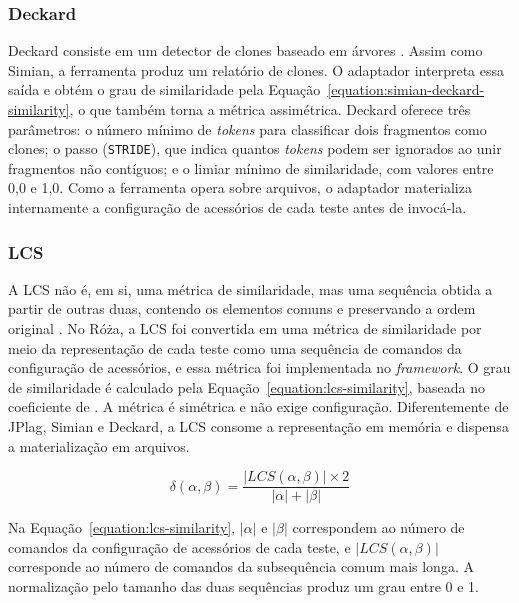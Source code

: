 \subsubsection{Deckard}

Deckard consiste em um detector de clones baseado em árvores \cite{jiang:etal:2007}. Assim como Simian, a ferramenta produz um relatório de clones. O adaptador interpreta essa saída e obtém o grau de similaridade pela Equação~\ref{equation:simian-deckard-similarity}, o que também torna a métrica assimétrica. Deckard oferece três parâmetros: o número mínimo de \textit{tokens} para classificar dois fragmentos como clones; o passo (\texttt{STRIDE}), que indica quantos \textit{tokens} podem ser ignorados ao unir fragmentos não contíguos; e o limiar mínimo de similaridade, com valores entre 0,0 e 1,0. Como a ferramenta opera sobre arquivos, o adaptador materializa internamente a configuração de acessórios de cada teste antes de invocá-la.

\subsubsection{LCS}

A LCS não é, em si, uma métrica de similaridade, mas uma sequência obtida a partir de outras duas, contendo os elementos comuns e preservando a ordem original \cite{hirschberg:1977}. No Róża, a LCS foi convertida em uma métrica de similaridade por meio da representação de cada teste como uma sequência de comandos da configuração de acessórios, e essa métrica foi implementada no \textit{framework}. O grau de similaridade é calculado pela Equação~\ref{equation:lcs-similarity}, baseada no coeficiente de . A métrica é simétrica e não exige configuração. Diferentemente de JPlag, Simian e Deckard, a LCS consome a representação em memória e dispensa a materialização em arquivos.

\begin{equation}
	\label{equation:lcs-similarity}
	\delta(\alpha, \beta) = \frac{\left|LCS(\alpha, \beta)\right| \times 2}{\left|\alpha\right| + \left|\beta\right|}
\end{equation}

Na Equação~\ref{equation:lcs-similarity}, $|\alpha|$ e $|\beta|$ correspondem ao número de comandos da configuração de acessórios de cada teste, e $|LCS(\alpha, \beta)|$ corresponde ao número de comandos da subsequência comum mais longa. A normalização pelo tamanho das duas sequências produz um grau entre 0 e 1.

